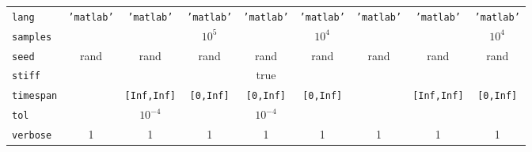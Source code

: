 \begin{MATLAB}
\begin{table}[t!]
{\begin{tabular}{|l|c|c|c|c|c|c|c|c|}
\cline{1-9}
\texttt{lang} & \texttt{'matlab'} & \texttt{'matlab'} & \texttt{'matlab'} & \texttt{'matlab'}  & \texttt{'matlab'} &\texttt{'matlab'} & \texttt{'matlab'} & \texttt{'matlab'}   \\
\cline{1-9}
\texttt{samples} &  & & $10^5$ &   &     $10^4$ & &   &  $10^4$ \\
\cline{1-9}
\texttt{seed} & rand & rand & rand & rand & rand &rand &rand &rand   \\
\cline{1-9}
\texttt{stiff} &  &   & & true &  & &   & \\
\cline{1-9}
\texttt{timespan} &  & \texttt{[Inf,Inf]} & \texttt{[0,Inf]} & \texttt{[0,Inf]} & \texttt{[0,Inf]} & & \texttt{[Inf,Inf]} & \texttt{[0,Inf]}   \\
\cline{1-9}
\texttt{tol} &  & $10^{-4}$ & & $10^{-4}$&  && & \\
\cline{1-9}
\texttt{verbose} & 1  & 1 & 1 & 1& 1& 1& 1& 1 \\
\cline{1-9}
\end{tabular}}
\label{TAB_solver_options}
\end{table}
\end{MATLAB}

